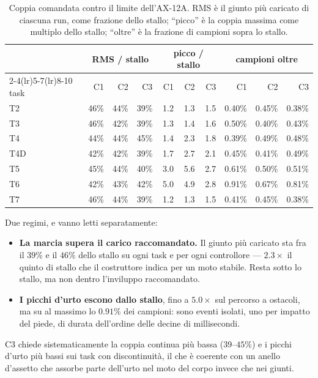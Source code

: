 \documentclass[11pt,a4paper]{article}
\newcommand{\Co}{\textsf{C1}}
\newcommand{\Ct}{\textsf{C2}}
\newcommand{\Cth}{\textsf{C3}}
\begin{document}
\begin{table}[htbp]
\centering
\caption{Coppia comandata contro il limite dell'AX-12A. RMS \`e il giunto pi\`u
caricato di ciascuna run, come frazione dello stallo; ``picco'' \`e la coppia
massima come multiplo dello stallo; ``oltre'' \`e la frazione di campioni sopra
lo stallo.}
\label{tab:feasibility}
\small
\begin{tabular}{@{}lrrrrrrrrr@{}}
\toprule
& \multicolumn{3}{c}{RMS / stallo} & \multicolumn{3}{c}{picco / stallo}
& \multicolumn{3}{c}{campioni oltre} \\
\cmidrule(lr){2-4}\cmidrule(lr){5-7}\cmidrule(lr){8-10}
task & \Co & \Ct & \Cth & \Co & \Ct & \Cth & \Co & \Ct & \Cth \\
\midrule
T2  & 46\% & 44\% & 39\% & 1.2 & 1.3 & 1.5 & 0.40\% & 0.45\% & 0.38\% \\
T3  & 46\% & 42\% & 39\% & 1.3 & 1.4 & 1.6 & 0.50\% & 0.40\% & 0.43\% \\
T4  & 44\% & 44\% & 45\% & 1.4 & 2.3 & 1.8 & 0.39\% & 0.49\% & 0.48\% \\
T4D & 42\% & 42\% & 39\% & 1.7 & 2.7 & 2.1 & 0.45\% & 0.41\% & 0.49\% \\
T5  & 45\% & 44\% & 40\% & 3.0 & 5.6 & 2.7 & 0.61\% & 0.50\% & 0.51\% \\
T6  & 42\% & 43\% & 42\% & 5.0 & 4.9 & 2.8 & 0.91\% & 0.67\% & 0.81\% \\
T7  & 46\% & 44\% & 39\% & 1.2 & 1.3 & 1.5 & 0.41\% & 0.45\% & 0.38\% \\
\bottomrule
\end{tabular}
\end{table}

Due regimi, e vanno letti separatamente:

\begin{itemize}
\item \textbf{La marcia supera il carico raccomandato.} Il giunto pi\`u caricato
sta fra il $39\%$ e il $46\%$ dello stallo su ogni task e per ogni controllore
--- $2.3\times$ il quinto di stallo che il costruttore indica per un moto
stabile. Resta sotto lo stallo, ma non dentro l'inviluppo raccomandato.
\item \textbf{I picchi d'urto escono dallo stallo}, fino a $5.0\times$ sul
percorso a ostacoli, ma su al massimo lo $0.91\%$ dei campioni: sono eventi
isolati, uno per impatto del piede, di durata dell'ordine delle decine di
millisecondi.
\end{itemize}

\Cth{} chiede sistematicamente la coppia continua pi\`u bassa ($39$--$45\%$) e i
picchi d'urto pi\`u bassi sui task con discontinuit\`a, il che \`e coerente con un
anello d'assetto che assorbe parte dell'urto nel moto del corpo invece che nei
giunti.
\end{document}
